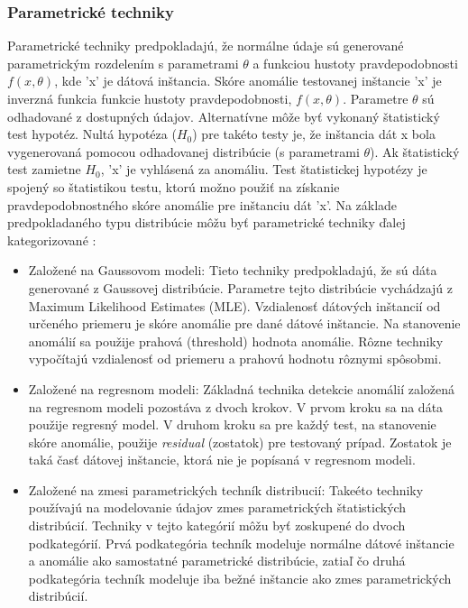 \subsubsection{Parametrické techniky}
Parametrické techniky predpokladajú, že normálne údaje sú generované parametrickým rozdelením s parametrami $\theta$ a funkciou hustoty pravdepodobnosti $f(x,\theta)$, kde 'x' je dátová inštancia. Skóre anomálie testovanej inštancie 'x'  je inverzná funkcia funkcie hustoty pravdepodobnosti, $f(x,\theta)$.  Parametre $\theta$ sú  odhadované z dostupných údajov. Alternatívne môže byť vykonaný štatistický test hypotéz. Nultá
hypotéza ($H_0$) pre takéto testy je, že inštancia dát x bola vygenerovaná pomocou
odhadovanej distribúcie (s parametrami $\theta$). Ak štatistický test zamietne $H_0$, 'x' je
vyhlásená za anomáliu. Test štatistickej hypotézy je spojený so štatistikou testu,
ktorú možno použiť na získanie pravdepodobnostného skóre anomálie pre inštanciu dát 'x'.
Na základe predpokladaného typu distribúcie môžu byť parametrické techniky ďalej
kategorizované :
\begin{itemize}
    \item Založené na Gaussovom modeli: Tieto techniky predpokladajú, že sú dáta generované z Gaussovej distribúcie.   Parametre tejto distribúcie vychádzajú z Maximum Likelihood Estimates (MLE). Vzdialenosť dátových inštancií od určeného priemeru je skóre anomálie pre dané dátové inštancie. Na stanovenie anomálií sa použije prahová (threshold) hodnota
anomálie. Rôzne techniky  vypočítajú vzdialenosť od priemeru a
prahovú hodnotu rôznymi spôsobmi.
\item Založené na regresnom modeli: Základná technika detekcie anomálií založená na regresnom modeli pozostáva z dvoch krokov.
V prvom kroku sa na dáta použije regresný model. V druhom kroku sa pre každý test, na stanovenie skóre anomálie, použije \emph{residual} (zostatok) pre testovaný prípad. Zostatok je taká časť dátovej inštancie, ktorá nie je popísaná v regresnom modeli.
\item Založené na zmesi parametrických techník distribucií: Takeéto techniky používajú na modelovanie údajov zmes parametrických štatistických distribúcií. Techniky v tejto kategórií môžu byť zoskupené do dvoch podkategórií. Prvá podkategória techník modeluje normálne dátové 
inštancie a anomálie ako samostatné parametrické distribúcie, zatiaľ čo druhá podkategória techník modeluje iba bežné inštancie ako zmes parametrických distribúcií.
\end{itemize} \cite{Chandola}
